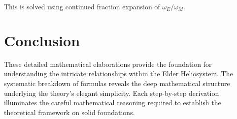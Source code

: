 This is solved using continued fraction expansion of $\omega_E/\omega_M$.

\section{Conclusion}

These detailed mathematical elaborations provide the foundation for understanding the intricate relationships within the Elder Heliosystem. The systematic breakdown of formulas reveals the deep mathematical structure underlying the theory's elegant simplicity. Each step-by-step derivation illuminates the careful mathematical reasoning required to establish the theoretical framework on solid foundations.